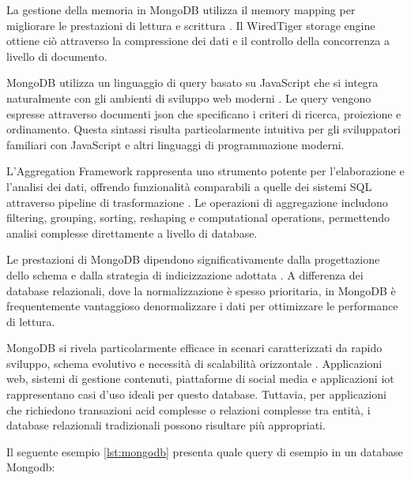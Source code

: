 La gestione della memoria in MongoDB utilizza il memory mapping per migliorare le prestazioni di lettura e scrittura
\cite{dayley2014mongodb}. Il WiredTiger storage engine ottiene ciò attraverso la compressione dei dati e il controllo
della concorrenza a livello di documento.

MongoDB utilizza un linguaggio di query basato su JavaScript che si integra naturalmente con gli ambienti
di sviluppo web moderni \cite{harrison2015mongodb}. Le query vengono espresse attraverso documenti \acrshort{json}
che specificano i criteri di ricerca, proiezione e ordinamento. Questa sintassi risulta particolarmente intuitiva
per gli sviluppatori familiari con JavaScript e altri linguaggi di programmazione moderni.

L'Aggregation Framework rappresenta uno strumento potente per l'elaborazione e l'analisi dei dati,
offrendo funzionalità comparabili a quelle dei sistemi SQL attraverso pipeline di trasformazione
\cite{membrey2014definitive}. Le operazioni di aggregazione includono filtering, grouping, sorting,
reshaping e computational operations, permettendo analisi complesse direttamente a livello di database.

Le prestazioni di MongoDB dipendono significativamente dalla progettazione dello schema e dalla strategia
di indicizzazione adottata \cite{chodorow2013mongodb}. A differenza dei database relazionali,
dove la normalizzazione è spesso prioritaria, in MongoDB è frequentemente vantaggioso denormalizzare i dati
per ottimizzare le performance di lettura.

MongoDB si rivela particolarmente efficace in scenari caratterizzati da rapido sviluppo,
schema evolutivo e necessità di scalabilità orizzontale \cite{banker2011mongodb}.
Applicazioni web, sistemi di gestione contenuti, piattaforme di social media e applicazioni \acrshort{iot}
rappresentano casi d'uso ideali per questo database. Tuttavia, per applicazioni che richiedono
transazioni \acrshort{acid} complesse o relazioni complesse tra entità, i database relazionali
tradizionali possono risultare più appropriati.

Il seguente esempio \ref{lst:mongodb} presenta quale query di esempio in un database Mongodb:

